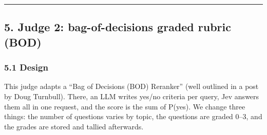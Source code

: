 \documentclass[
  10pt,
]{article}
\begin{document}
\begin{center}\rule{0.5\linewidth}{0.5pt}\end{center}

\subsection{5. Judge 2: bag-of-decisions graded rubric
(BOD)}\label{judge-2-bag-of-decisions-graded-rubric-bod}

\subsubsection{5.1 Design}\label{design}

This judge adapts a ``Bag of Decisions (BOD) Reranker'' (well outlined
in a post by Doug Turnbull). There, an LLM writes yes/no criteria per
query, Jev answers them all in one request, and the score is the sum of
P(yes). We change three things: the number of questions varies by topic,
the questions are graded 0--3, and the grades are stored and tallied
afterwards.
\end{document}
